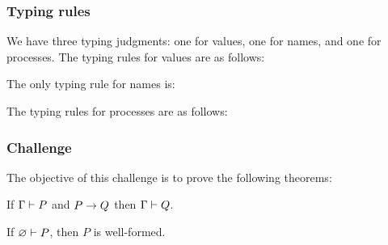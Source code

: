 \subsubsection{Typing rules}
We have three typing judgments: one for values, one for names, and one for processes.
The typing rules for values are as follows:
The only typing rule for names is:
\begin{mathpar}
\end{mathpar}
The typing rules for processes are as follows:

\subsubsection{Challenge}
The objective of this challenge is to prove the following theorems:
\begin{theorem}
  If \( \types{\Gamma}{P} \) and \( \reduces{P}{Q} \) then \( \types{\Gamma}{Q} \).
\end{theorem}

\begin{theorem}
  If \( \types{\Cempty}{P} \), then \( P \) is well-formed.
\end{theorem}

